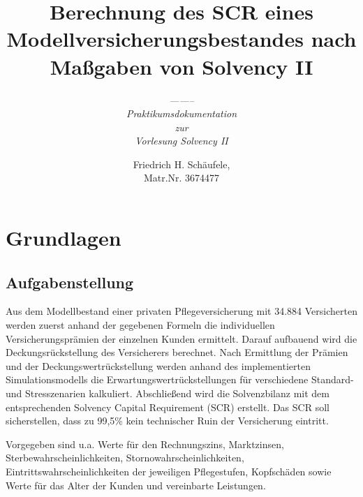 \documentclass[parskip,12pt,paper=a4]{scrartcl}
\date{}
\begin{document}
\titlehead{Fachbereich Mathematik\\Johann Wolfgang Goethe Universität}
\title{Berechnung des SCR eines Modellversicherungsbestandes nach Maßgaben von Solvency II}
\subtitle{\textit{--------\\Praktikumsdokumentation\\zur\\ Vorlesung Solvency II}}
\author{Friedrich H. Schäufele, \\ Matr.Nr. 3674477}

\maketitle


\begin{abstract}
\noindent  
\end{abstract}
\clearpage
\tableofcontents
\clearpage


\section{Grundlagen}

\subsection{Aufgabenstellung}
Aus dem Modellbestand einer privaten Pflegeversicherung mit 34.884 Versicherten werden zuerst anhand der 
gegebenen Formeln die individuellen Versicherungsprämien der einzelnen Kunden ermittelt. Darauf aufbauend wird die Deckungsrückstellung des Versicherers berechnet. 
Nach Ermittlung der Prämien und der Deckungswertrückstellung werden anhand des implementierten Simulationsmodells
die Erwartungswertrückstellungen für verschiedene Standard- und Stresszenarien kalkuliert.
Abschließend wird die Solvenzbilanz mit dem entsprechenden Solvency Capital Requirement (SCR) erstellt.  
Das SCR soll sicherstellen, dass zu 99,5\% kein technischer Ruin der Versicherung eintritt.

Vorgegeben sind u.a. Werte für den Rechnungszins, Marktzinsen, Sterbewahrscheinlichkeiten, Stornowahrscheinlichkeiten, Eintrittswahrscheinlichkeiten der jeweiligen Pflegestufen, Kopfschäden sowie Werte für das Alter der Kunden und vereinbarte Leistungen.
\end{document}
